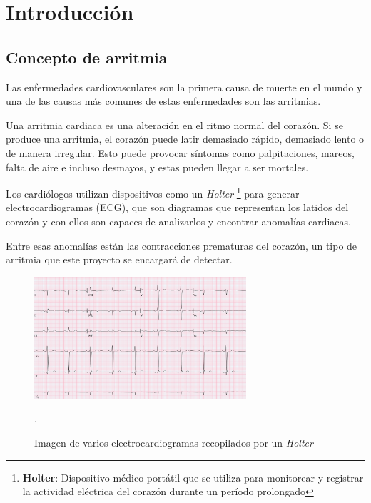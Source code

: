 \titlespacing*{\chapter}{0pt}{-1.25cm}{25pt}
\chapter{Introducción}
\section{Concepto de arritmia}
Las enfermedades cardiovasculares son la primera causa de muerte en el mundo \cite{who_top_10_causes} y una de las causas más comunes de estas enfermedades son las arritmias.

Una arritmia cardiaca es una alteración en el ritmo normal del corazón. Si se produce una arritmia, el corazón puede latir demasiado rápido, demasiado lento o de manera irregular. Esto puede provocar síntomas como palpitaciones, mareos, falta de aire e incluso desmayos, y estas pueden llegar a ser mortales.

Los cardiólogos utilizan dispositivos como un \textit{Holter} \footnote{\textbf{Holter}: Dispositivo médico portátil que se utiliza para monitorear y registrar la actividad eléctrica del corazón durante un período prolongado} para generar electrocardiogramas (ECG), que son diagramas que representan los latidos del corazón y con ellos son capaces de analizarlos y encontrar anomalías cardiacas.

Entre esas anomalías están las contracciones prematuras del corazón, un tipo de arritmia que este proyecto se encargará de detectar. 

\begin{figure}[h!]
	\centering
	\includegraphics[width=0.7\textwidth]{./Images/img_introduccion/electrocardiograma.png}
	\caption{Imagen de varios electrocardiogramas recopilados por un \textit{Holter} \cite{fotoElectrocardiograma}}.
	\label{fig:electrocardiogramas}
\end{figure}

